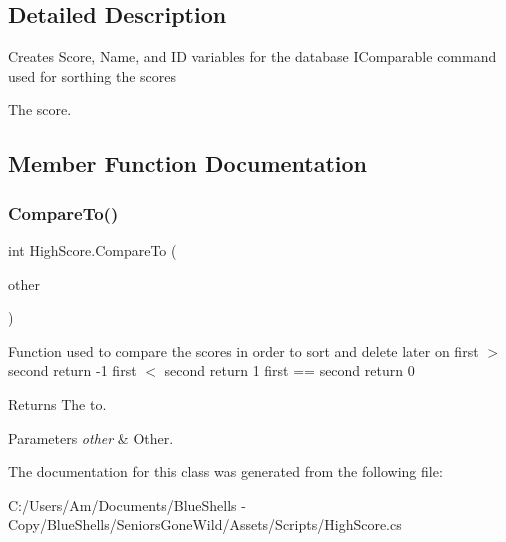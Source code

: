 \subsection{Detailed Description}
Creates Score, Name, and ID variables for the database I\+Comparable command used for sorthing the scores 

The score.

\subsection{Member Function Documentation}
\mbox{\label{class_high_score_acd16825af79f7d613806515c82d27674}} 
\subsubsection{\texorpdfstring{Compare\+To()}{CompareTo()}}
{\footnotesize\ttfamily int High\+Score.\+Compare\+To (\begin{DoxyParamCaption}\item[{\mbox{\hyperlink{class_high_score}{High\+Score}}}]{other }\end{DoxyParamCaption})}



Function used to compare the scores in order to sort and delete later on first $>$ second return -\/1 first $<$ second return 1 first == second return 0 

\begin{DoxyReturn}{Returns}
The to.
\end{DoxyReturn}

\begin{DoxyParams}{Parameters}
{\em other} & Other.\\
\hline
\end{DoxyParams}


The documentation for this class was generated from the following file\+:\begin{DoxyCompactItemize}
\item 
C\+:/\+Users/\+Am/\+Documents/\+Blue\+Shells -\/ Copy/\+Blue\+Shells/\+Seniors\+Gone\+Wild/\+Assets/\+Scripts/High\+Score.\+cs\end{DoxyCompactItemize}
